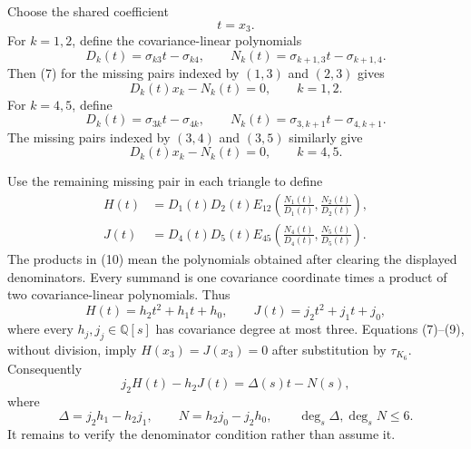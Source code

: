 Choose the shared coefficient
\[
 t=x_3.
\]
For \(k=1,2\), define the covariance-linear polynomials
\[
 D_k(t)=\sigma_{k3}t-\sigma_{k4},\qquad
 N_k(t)=\sigma_{k+1,3}t-\sigma_{k+1,4}.
\]
Then (7) for the missing pairs indexed by \((1,3)\) and \((2,3)\) gives
\[
 D_k(t)x_k-N_k(t)=0,\qquad k=1,2. \tag{8}
\]
For \(k=4,5\), define
\[
 D_k(t)=\sigma_{3k}t-\sigma_{4k},\qquad
 N_k(t)=\sigma_{3,k+1}t-\sigma_{4,k+1}.
\]
The missing pairs indexed by \((3,4)\) and \((3,5)\) similarly give
\[
 D_k(t)x_k-N_k(t)=0,\qquad k=4,5. \tag{9}
\]

Use the remaining missing pair in each triangle to define
\[
 \begin{aligned}
 H(t)&=D_1(t)D_2(t)E_{12}\!\left(\frac{N_1(t)}{D_1(t)},\frac{N_2(t)}{D_2(t)}\right),\\
 J(t)&=D_4(t)D_5(t)E_{45}\!\left(\frac{N_4(t)}{D_4(t)},\frac{N_5(t)}{D_5(t)}\right).
 \end{aligned} \tag{10}
\]
The products in (10) mean the polynomials obtained after clearing the displayed denominators.  Every summand is one covariance coordinate times a product of two covariance-linear polynomials.  Thus
\[
 H(t)=h_2t^2+h_1t+h_0,\qquad
 J(t)=j_2t^2+j_1t+j_0, \tag{11}
\]
where every \(h_j,j_j\in\mathbb Q[s]\) has covariance degree at most three.  Equations (7)--(9), without division, imply \(H(x_3)=J(x_3)=0\) after substitution by \(\tau_{K_6}\).  Consequently
\[
 j_2H(t)-h_2J(t)
 =\Delta(s)t-N(s), \tag{12}
\]
where
\[
 \Delta=j_2h_1-h_2j_1,\qquad
 N=h_2j_0-j_2h_0,\qquad
 \deg_s\Delta,\deg_sN\leq6. \tag{13}
\]
It remains to verify the denominator condition rather than assume it.

